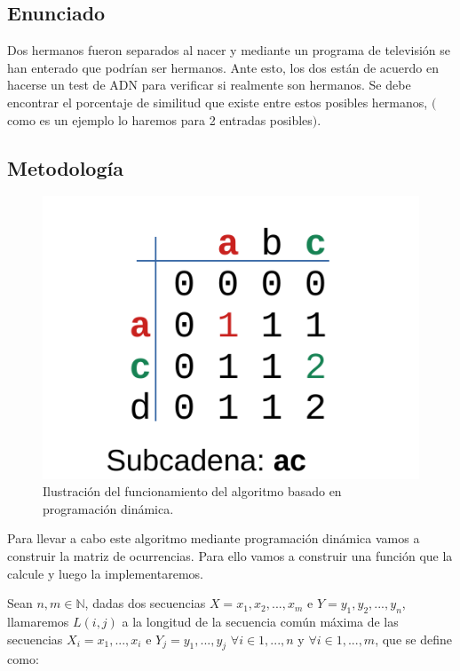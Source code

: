 \subsection{Enunciado}
Dos hermanos fueron separados al nacer y mediante un programa de televisión se han
enterado que podrían ser hermanos. Ante esto, los dos están de acuerdo en hacerse un test de
ADN para verificar si realmente son hermanos. Se debe encontrar el porcentaje de similitud que existe 
entre estos posibles hermanos, $($como es un ejemplo lo haremos para 2 entradas posibles$)$.

\subsection{Metodología} \label{sec:metodologia}

\begin{figure}[h]
  \centering
  \includegraphics[scale=0.6]{img/dibujito.pdf}
  \caption{Ilustración del funcionamiento del algoritmo basado en programación dinámica.}
\end{figure}

Para llevar a cabo este algoritmo mediante programación dinámica vamos a construir la matriz de 
ocurrencias. Para ello vamos a construir una función que la calcule y luego la implementaremos.

Sean $n,m \in \mathbb{N}$, dadas dos secuencias $X = { x_1,x_2,...,x_m}$ e $Y = { y_1,y_2,...,y_n}$, llamaremos $L(i,j)$ a la 
longitud de la secuencia común máxima de las secuencias $X_i = {x_1,...,x_i}$ e $Y_j = {y_1,...,y_j}$ $\forall i \in {1,...,n} $ y $\forall i \in {1,...,m}$, 
que se define como:  

